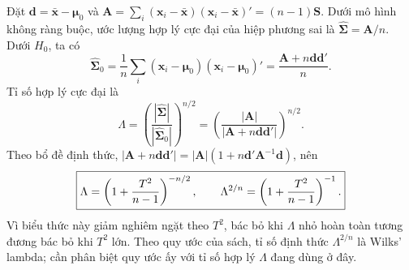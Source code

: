 Đặt $\mathbf d=\bar{\mathbf x}-\boldsymbol\mu_0$ và
$\mathbf A=\sum_i(\mathbf x_i-\bar{\mathbf x})(\mathbf x_i-\bar{\mathbf x})'=(n-1)\mathbf S$.
Dưới mô hình không ràng buộc, ước lượng hợp lý cực đại của hiệp phương sai là
$\widehat{\boldsymbol\Sigma}=\mathbf A/n$. Dưới $H_0$, ta có
\[
\widehat{\boldsymbol\Sigma}_0
=\frac1n\sum_i(\mathbf x_i-\boldsymbol\mu_0)(\mathbf x_i-\boldsymbol\mu_0)'
=\frac{\mathbf A+n\mathbf d\mathbf d'}n.
\]
Tỉ số hợp lý cực đại là
\[
\Lambda=\left(\frac{|\widehat{\boldsymbol\Sigma}|}
{|\widehat{\boldsymbol\Sigma}_0|}\right)^{n/2}
=\left(\frac{|\mathbf A|}{|\mathbf A+n\mathbf d\mathbf d'|}\right)^{n/2}.
\]
Theo bổ đề định thức, $|\mathbf A+n\mathbf d\mathbf d'|
=|\mathbf A|(1+n\mathbf d'\mathbf A^{-1}\mathbf d)$, nên
\[
\boxed{\Lambda=\left(1+\frac{T^2}{n-1}\right)^{-n/2},\qquad
\Lambda^{2/n}=\left(1+\frac{T^2}{n-1}\right)^{-1}.}
\]
Vì biểu thức này giảm nghiêm ngặt theo $T^2$, bác bỏ khi $\Lambda$ nhỏ
hoàn toàn tương đương bác bỏ khi $T^2$ lớn. Theo quy ước của sách,
tỉ số định thức $\Lambda^{2/n}$ là Wilks' lambda; cần phân biệt
quy ước ấy với tỉ số hợp lý $\Lambda$ đang dùng ở đây.
